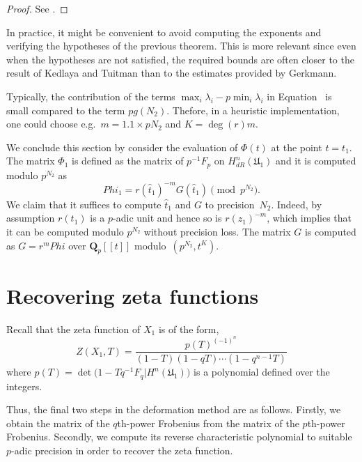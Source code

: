 \begin{proof}
See \citep[Theorem~2.1]{KedlayaTuitman2012}.
\end{proof}

\begin{rem}
In practice, it might be convenient to avoid computing the exponents and 
verifying the hypotheses of the previous theorem.  This is more relevant 
since even when the hypotheses are not satisfied, the required bounds are 
often closer to the result of Kedlaya and Tuitman than to the estimates 
provided by Gerkmann.

Typically, the contribution of the terms $\max_i \lambda_i - p \min_i \lambda_i$ 
in Equation~\citep{eq:KedlayaTuitman} is small compared to the term $p g(N_2)$. 
Thefore, in a heuristic implementation, one could choose e.g.\ 
$m = 1.1 \times p N_2$ and $K = \deg(r) m$.
\end{rem}

We conclude this section by consider the evaluation of $\Phi(t)$ at the point 
$t=t_1$.  The matrix $\Phi_1$ is defined as the matrix of $p^{-1} F_p$ 
on $H_{dR}^n(\mathfrak{U}_1)$ and it is computed modulo $p^{N_2}$ as 
\begin{equation*}
Phi_1 = r(\hat{t}_1)^{-m} G(\hat{t}_1) \pmod{p^{N_2}}.
\end{equation*}
We claim that it suffices to compute $\hat{t}_1$ and $G$ to precision~$N_2$. 
Indeed, by assumption $r(t_1)$ is a $p$-adic unit and hence so is 
$r(\hat{z}_1)^{-m}$, which implies that it can be computed modulo $p^{N_2}$ 
without precision loss.  The matrix $G$ is computed as $G = r^m Phi$ over 
$\mathbf{Q}_p[[t]]$ modulo~$(p^{N_2}, t^{K})$.

\section{Recovering zeta functions}

Recall that the zeta function of $X_1$ is of the form,
\begin{equation*}
Z(X_1,T) = \frac{p(T)^{(-1)^n}}{(1 - T) (1 - qT) \dotsm (1 - q^{n-1}T)}
\end{equation*}
where $p(T) = \det \bigl( 1 - T q^{-1} F_q | H^n(\mathfrak{U}_1) \bigr)$ 
is a polynomial defined over the integers.

Thus, the final two steps in the deformation method are as follows.  
Firstly, we obtain the matrix of the $q$th-power Frobenius from the matrix of 
the $p$th-power Frobenius.  Secondly, we compute its reverse characteristic 
polynomial to suitable $p$-adic precision in order to recover the zeta 
function.

